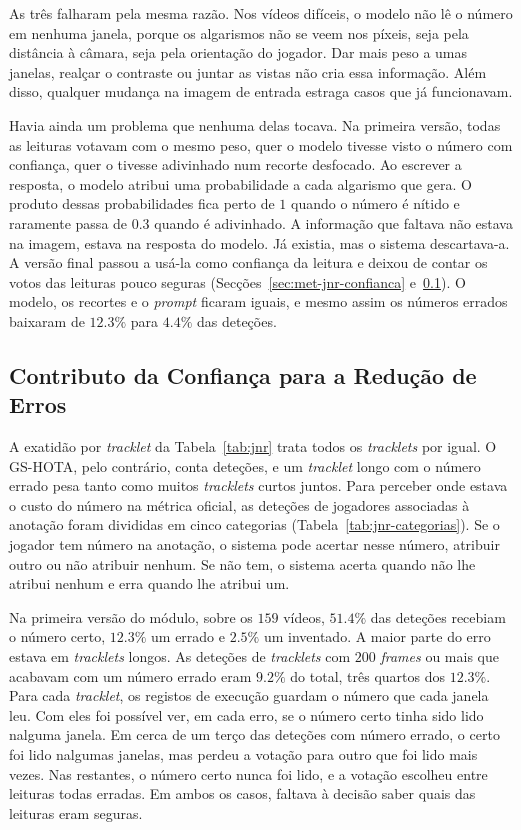 As três falharam pela mesma razão. Nos vídeos difíceis, o modelo não lê o número em nenhuma janela, porque os algarismos não se veem nos píxeis, seja pela distância à câmara, seja pela orientação do jogador. Dar mais peso a umas janelas, realçar o contraste ou juntar as vistas não cria essa informação. Além disso, qualquer mudança na imagem de entrada estraga casos que já funcionavam.

Havia ainda um problema que nenhuma delas tocava. Na primeira versão, todas as leituras votavam com o mesmo peso, quer o modelo tivesse visto o número com confiança, quer o tivesse adivinhado num recorte desfocado. Ao escrever a resposta, o modelo atribui uma probabilidade a cada algarismo que gera. O produto dessas probabilidades fica perto de $1$ quando o número é nítido e raramente passa de $0.3$ quando é adivinhado. A informação que faltava não estava na imagem, estava na resposta do modelo. Já existia, mas o sistema descartava-a. A versão final passou a usá-la como confiança da leitura e deixou de contar os votos das leituras pouco seguras (Secções~\ref{sec:met-jnr-confianca} e~\ref{sec:res_jnr_confianca}). O modelo, os recortes e o \emph{prompt} ficaram iguais, e mesmo assim os números errados baixaram de $12.3\%$ para $4.4\%$ das deteções.

\subsection{Contributo da Confiança para a Redução de Erros}\label{sec:res_jnr_confianca}

A exatidão por \emph{tracklet} da Tabela~\ref{tab:jnr} trata todos os \emph{tracklets} por igual. O GS-HOTA, pelo contrário, conta deteções, e um \emph{tracklet} longo com o número errado pesa tanto como muitos \emph{tracklets} curtos juntos. Para perceber onde estava o custo do número na métrica oficial, as deteções de jogadores associadas à anotação foram divididas em cinco categorias (Tabela~\ref{tab:jnr-categorias}). Se o jogador tem número na anotação, o sistema pode acertar nesse número, atribuir outro ou não atribuir nenhum. Se não tem, o sistema acerta quando não lhe atribui nenhum e erra quando lhe atribui um.

Na primeira versão do módulo, sobre os $159$ vídeos, $51.4\%$ das deteções recebiam o número certo, $12.3\%$ um errado e $2.5\%$ um inventado. A maior parte do erro estava em \emph{tracklets} longos. As deteções de \emph{tracklets} com $200$ \emph{frames} ou mais que acabavam com um número errado eram $9.2\%$ do total, três quartos dos $12.3\%$. Para cada \emph{tracklet}, os registos de execução guardam o número que cada janela leu. Com eles foi possível ver, em cada erro, se o número certo tinha sido lido nalguma janela. Em cerca de um terço das deteções com número errado, o certo foi lido nalgumas janelas, mas perdeu a votação para outro que foi lido mais vezes. Nas restantes, o número certo nunca foi lido, e a votação escolheu entre leituras todas erradas. Em ambos os casos, faltava à decisão saber quais das leituras eram seguras.

